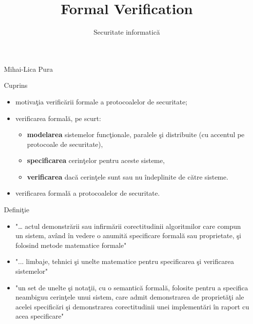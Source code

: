 \documentclass{beamer}
\title{Formal Verification}
\subtitle{Securitate informatică}
\begin{document}
\begin{frame}
  \titlepage
  
\begin{flushright}
Mihai-Lica Pura\\
\end{flushright}

\end{frame}



\begin{frame}{Cuprins}


\begin{itemize}
\item
motivaţia verificării formale a protocoalelor de securitate;
\item
verificarea formală, pe scurt:
\begin{itemize}
\item
\textbf{modelarea} sistemelor funcţionale, paralele şi distribuite (cu accentul pe protocoale de securitate), 
\item
\textbf{specificarea} cerinţelor pentru aceste sisteme,
\item
\textbf{verificarea} dacă cerinţele sunt sau nu îndeplinite de către sisteme.
\end{itemize} 
\item
verificarea formală a protocoalelor de securitate.
\end{itemize} 
\end{frame}



\begin{frame}{Definiţie}

\begin{itemize}
\item
"… actul demonstrării sau infirmării corectitudinii algoritmilor care compun un sistem, având în vedere o anumită specificare formală sau proprietate, şi folosind metode matematice formale"\\

\item
"... limbaje, tehnici şi unelte matematice pentru specificarea şi verificarea sistemelor"\\

\item
"un set de unelte şi notaţii, cu o semantică formală, folosite pentru a specifica neambiguu cerinţele unui sistem, care admit demonstrarea de proprietăţi ale acelei specificări şi demonstrarea corectitudinii unei implementări în raport cu acea specificare"

\end{itemize}

\end{frame}
\end{document}
